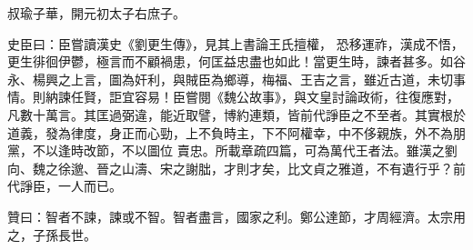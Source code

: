 \begin{pinyinscope}
 叔瑜子華，開元初太子右庶子。



 史臣曰：臣嘗讀漢史《劉更生傳》，見其上書論王氏擅權，
 恐移運祚，漢成不悟，更生徘徊伊鬱，極言而不顧禍患，何匡益忠盡也如此！當更生時，諫者甚多。如谷永、楊興之上言，圖為奸利，與賊臣為鄉導，梅福、王吉之言，雖近古道，未切事情。則納諫任賢，詎宜容易！臣嘗閱《魏公故事》，與文皇討論政術，往復應對，凡數十萬言。其匡過弼違，能近取譬，博約連類，皆前代諍臣之不至者。其實根於道義，發為律度，身正而心勁，上不負時主，下不阿權幸，中不侈親族，外不為朋黨，不以逢時改節，不以圖位
 賣忠。所載章疏四篇，可為萬代王者法。雖漢之劉向、魏之徐邈、晉之山濤、宋之謝朏，才則才矣，比文貞之雅道，不有遺行乎？前代諍臣，一人而已。



 贊曰：智者不諫，諫或不智。智者盡言，國家之利。鄭公達節，才周經濟。太宗用之，子孫長世。



\end{pinyinscope}